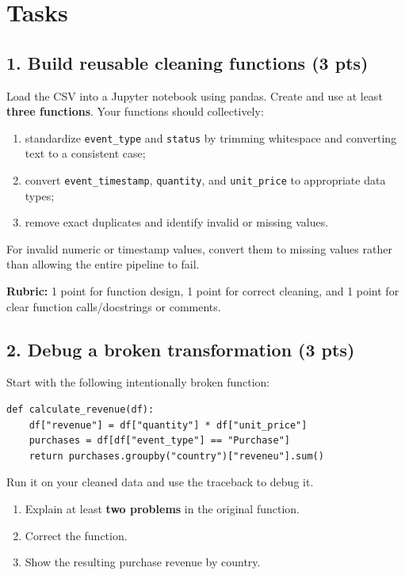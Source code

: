 \documentclass[10pt]{article}
\begin{document}
\section*{Tasks}

\subsection*{1. Build reusable cleaning functions (3 pts)}
Load the CSV into a Jupyter notebook using pandas. Create and use at least
\textbf{three functions}. Your functions should collectively:

\begin{enumerate}[label=\alph*)]
    \item standardize \texttt{event\_type} and \texttt{status} by trimming
    whitespace and converting text to a consistent case;
    \item convert \texttt{event\_timestamp}, \texttt{quantity}, and
    \texttt{unit\_price} to appropriate data types;
    \item remove exact duplicates and identify invalid or missing values.
\end{enumerate}

For invalid numeric or timestamp values, convert them to missing values
rather than allowing the entire pipeline to fail.

\textbf{Rubric:} 1 point for function design, 1 point for correct cleaning,
and 1 point for clear function calls/docstrings or comments.

\subsection*{2. Debug a broken transformation (3 pts)}
Start with the following intentionally broken function:

\begin{lstlisting}
def calculate_revenue(df):
    df["revenue"] = df["quantity"] * df["unit_price"]
    purchases = df[df["event_type"] == "Purchase"]
    return purchases.groupby("country")["reveneu"].sum()
\end{lstlisting}

Run it on your cleaned data and use the traceback to debug it.

\begin{enumerate}[label=\alph*)]
    \item Explain at least \textbf{two problems} in the original function.
    \item Correct the function.
    \item Show the resulting purchase revenue by country.
\end{enumerate}
\end{document}
